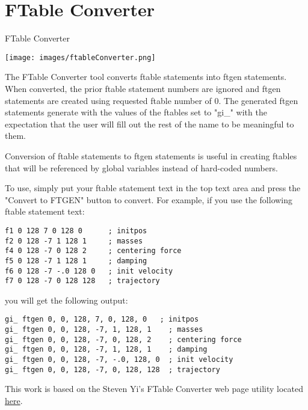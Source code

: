 \section{FTable Converter}\label{ftableConverter}

FTable Converter

\texttt{[image: images/ftableConverter.png]}

The FTable Converter tool converts ftable statements into ftgen
statements. When converted, the prior ftable statement numbers are
ignored and ftgen statements are created using requested ftable number
of 0. The generated ftgen statements generate with the values of the
ftables set to "gi\_" with the expectation that the user will fill out
the rest of the name to be meaningful to them.

Conversion of ftable statements to ftgen statements is useful in
creating ftables that will be referenced by global variables instead of
hard-coded numbers.

To use, simply put your ftable statement text in the top text area and
press the "Convert to FTGEN" button to convert. For example, if you use
the following ftable statement text:

\begin{verbatim}
f1 0 128 7 0 128 0      ; initpos
f2 0 128 -7 1 128 1     ; masses
f4 0 128 -7 0 128 2     ; centering force
f5 0 128 -7 1 128 1     ; damping
f6 0 128 -7 -.0 128 0   ; init velocity
f7 0 128 -7 0 128 128   ; trajectory
\end{verbatim}

you will get the following output:

\begin{verbatim}
gi_ ftgen 0, 0, 128, 7, 0, 128, 0   ; initpos
gi_ ftgen 0, 0, 128, -7, 1, 128, 1    ; masses
gi_ ftgen 0, 0, 128, -7, 0, 128, 2    ; centering force
gi_ ftgen 0, 0, 128, -7, 1, 128, 1    ; damping
gi_ ftgen 0, 0, 128, -7, -.0, 128, 0  ; init velocity
gi_ ftgen 0, 0, 128, -7, 0, 128, 128  ; trajectory
\end{verbatim}

This work is based on the Steven Yi's FTable Converter web page utility
located \href{http://www.csounds.com/stevenyi/ftable.html}{here}.
